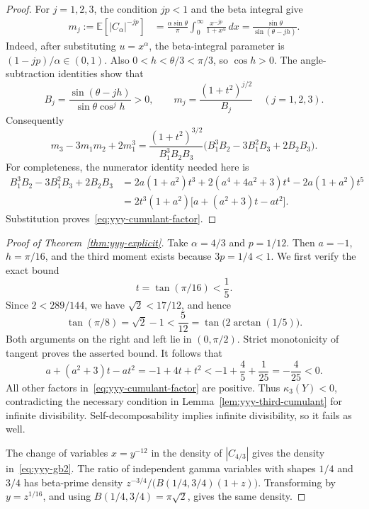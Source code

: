 \documentclass[11pt,a4paper]{article}
\theoremstyle{definition}
\theoremstyle{remark}
\newcommand{\E}{\mathbb E}
\numberwithin{equation}{section}
\begin{document}
\begin{proof}
For $j=1,2,3$, the condition $jp<1$ and the beta integral give
\begin{align}
 m_j:=\E[|C_\alpha|^{-jp}]
 &=\frac{\alpha\sin\theta}{\pi}
     \int_0^\infty\frac{x^{-jp}}{1+x^\alpha}\,dx
 =\frac{\sin\theta}{\sin(\theta-jh)}.
 \label{eq:yyy-moments}
\end{align}
Indeed, after substituting $u=x^\alpha$, the beta-integral parameter is
$(1-jp)/\alpha\in(0,1)$. Also
$0<h<\theta/3<\pi/3$, so $\cos h>0$. The angle-subtraction identities
show that
\[
 B_j=\frac{\sin(\theta-jh)}{\sin\theta\cos^j h}>0,
 \qquad
 m_j=\frac{(1+t^2)^{j/2}}{B_j}
 \quad(j=1,2,3).
\]
Consequently
\[
 m_3-3m_1m_2+2m_1^3
 =\frac{(1+t^2)^{3/2}}{B_1^3B_2B_3}
       \bigl(B_1^3B_2-3B_1^2B_3+2B_2B_3\bigr).
\]
For completeness, the numerator identity needed here is
\begin{align*}
 B_1^3B_2-3B_1^2B_3+2B_2B_3
 &=2a(1+a^2)t^3
   +2(a^4+4a^2+3)t^4-2a(1+a^2)t^5\\
 &=2t^3(1+a^2)\bigl[a+(a^2+3)t-at^2\bigr].
\end{align*}
Substitution proves~\eqref{eq:yyy-cumulant-factor}.
\end{proof}

\begin{proof}[Proof of Theorem~\ref{thm:yyy-explicit}]
Take $\alpha=4/3$ and $p=1/12$. Then
$a=-1$, $h=\pi/16$, and the third moment exists because $3p=1/4<1$.
We first verify the exact bound
\[
 t=\tan(\pi/16)<\frac15.
\]
Since $2<289/144$, we have $\sqrt2<17/12$, and hence
\[
 \tan(\pi/8)=\sqrt2-1<\frac5{12}
       =\tan\bigl(2\arctan(1/5)\bigr).
\]
Both arguments on the right and left lie in $(0,\pi/2)$.
Strict monotonicity of tangent proves the asserted bound. It follows that
\[
 a+(a^2+3)t-at^2=-1+4t+t^2
 <-1+\frac45+\frac1{25}=-\frac4{25}<0.
\]
All other factors in~\eqref{eq:yyy-cumulant-factor} are positive.
Thus $\kappa_3(Y)<0$, contradicting the necessary condition in
Lemma~\ref{lem:yyy-third-cumulant} for infinite divisibility.
Self-decomposability implies infinite divisibility, so it fails as well.

The change of variables $x=y^{-12}$ in the density of $|C_{4/3}|$
gives the density in~\eqref{eq:yyy-gb2}. The ratio of independent gamma
variables with shapes $1/4$ and $3/4$ has beta-prime density
$z^{-3/4}/\bigl(B(1/4,3/4)(1+z)\bigr)$. Transforming by $y=z^{1/16}$,
and using $B(1/4,3/4)=\pi\sqrt2$, gives the same density.
\end{proof}
\end{document}
